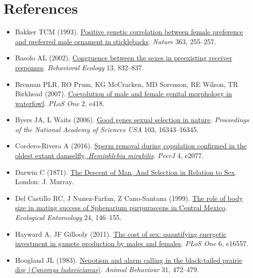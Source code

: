 \documentclass[
]{book}
\begin{document}
\hypertarget{references-10}{%
\section{References}\label{references-10}}

\begin{itemize}
\item
  Bakker TCM (1993). \href{https://www.nature.com/articles/363255a0}{Positive genetic correlation between female preference and preferred male ornament in sticklebacks}. \emph{Nature} 363, 255--257.
\item
  Basolo AL (2002). \href{https://academic.oup.com/beheco/article/13/6/832/196482}{Congruence between the sexes in preexisting receiver responses}. \emph{Behavioral Ecology} 13, 832--837.
\item
  Brennan PLR, RO Prum, KG McCracken, MD Sorenson, RE Wilson, TR Birkhead (2007). \href{https://journals.plos.org/plosone/article?id=10.1371/journal.pone.0000418}{Coevolution of male and female genital morphology in waterfowl}. \emph{PLoS One} 2, e418.
\item
  Byers JA, L Waits (2006). \href{https://www.pnas.org/content/103/44/16343}{Good genes sexual selection in nature}. \emph{Proceedings of the National Academy of Sciences USA} 103, 16343--16345.
\item
  Cordero-Rivera A (2016). \href{https://peerj.com/articles/2077/}{Sperm removal during copulation confirmed in the oldest extant damselfly, \emph{Hemiphlebia mirabilis}}. \emph{PeerJ} 4, e2077.
\item
  Darwin C (1871). \href{http://darwin-online.org.uk/content/frameset?pageseq=1\&itemID=F937.1\&viewtype=image}{The Descent of Man, And Selection in Relation to Sex}. London: J. Murray.
\item
  Del Castillo RC, J Nunez-Farfan, Z Cano-Santana (1999). \href{https://onlinelibrary.wiley.com/doi/abs/10.1046/j.1365-2311.1999.00188.x}{The role of body size in mating success of Sphenarium purpurascens in Central Mexico}. \emph{Ecological Entomology} 24, 146--155.
\item
  Hayward A, JF Gillooly (2011). \href{https://journals.plos.org/plosone/article?id=10.1371/journal.pone.0016557}{The cost of sex: quantifying energetic investment in gamete production by males and females}. \emph{PLoS One} 6, e16557.
\item
  Hoogland JL (1983). \href{https://www.sciencedirect.com/science/article/abs/pii/S0003347283800682}{Nepotism and alarm calling in the black-tailed prairie dog (\emph{Cynomys ludovicianus})}. \emph{Animal Behaviour} 31, 472--479.

\end{itemize}
\end{document}
